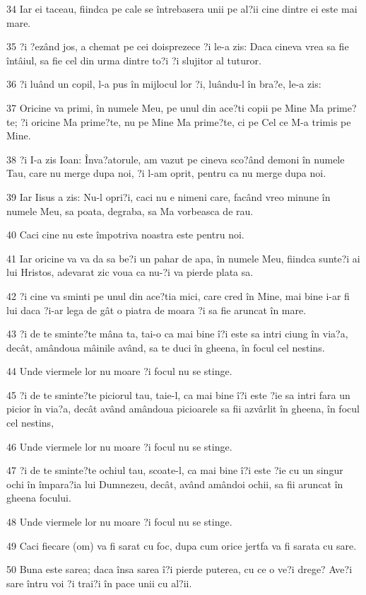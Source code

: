 \par 34 Iar ei taceau, fiindca pe cale se întrebasera unii pe al?ii cine dintre ei este mai mare.
\par 35 ?i ?ezând jos, a chemat pe cei doisprezece ?i le-a zis: Daca cineva vrea sa fie întâiul, sa fie cel din urma dintre to?i ?i slujitor al tuturor.
\par 36 ?i luând un copil, l-a pus în mijlocul lor ?i, luându-l în bra?e, le-a zis:
\par 37 Oricine va primi, în numele Meu, pe unul din ace?ti copii pe Mine Ma prime?te; ?i oricine Ma prime?te, nu pe Mine Ma prime?te, ci pe Cel ce M-a trimis pe Mine.
\par 38 ?i I-a zis Ioan: Înva?atorule, am vazut pe cineva sco?ând demoni în numele Tau, care nu merge dupa noi, ?i l-am oprit, pentru ca nu merge dupa noi.
\par 39 Iar Iisus a zis: Nu-l opri?i, caci nu e nimeni care, facând vreo minune în numele Meu, sa poata, degraba, sa Ma vorbeasca de rau.
\par 40 Caci cine nu este împotriva noastra este pentru noi.
\par 41 Iar oricine va va da sa be?i un pahar de apa, în numele Meu, fiindca sunte?i ai lui Hristos, adevarat zic voua ca nu-?i va pierde plata sa.
\par 42 ?i cine va sminti pe unul din ace?tia mici, care cred în Mine, mai bine i-ar fi lui daca ?i-ar lega de gât o piatra de moara ?i sa fie aruncat în mare.
\par 43 ?i de te sminte?te mâna ta, tai-o ca mai bine î?i este sa intri ciung în via?a, decât, amândoua mâinile având, sa te duci în gheena, în focul cel nestins.
\par 44 Unde viermele lor nu moare ?i focul nu se stinge.
\par 45 ?i de te sminte?te piciorul tau, taie-l, ca mai bine î?i este ?ie sa intri fara un picior în via?a, decât având amândoua picioarele sa fii azvârlit în gheena, în focul cel nestins,
\par 46 Unde viermele lor nu moare ?i focul nu se stinge.
\par 47 ?i de te sminte?te ochiul tau, scoate-l, ca mai bine î?i este ?ie cu un singur ochi în împara?ia lui Dumnezeu, decât, având amândoi ochii, sa fii aruncat în gheena focului.
\par 48 Unde viermele lor nu moare ?i focul nu se stinge.
\par 49 Caci fiecare (om) va fi sarat cu foc, dupa cum orice jertfa va fi sarata cu sare.
\par 50 Buna este sarea; daca însa sarea î?i pierde puterea, cu ce o ve?i drege? Ave?i sare întru voi ?i trai?i în pace unii cu al?ii.

